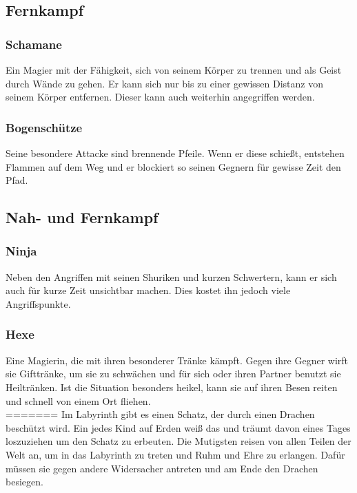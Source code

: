 \documentclass[10pt,a4paper,notitlepage]{report}
\begin{document}
\begin{flushleft}
\subsection{Fernkampf}
\subsubsection{Schamane}
Ein Magier mit der Fähigkeit, sich von seinem Körper zu trennen und als Geist durch Wände zu gehen. Er kann sich nur bis zu einer gewissen Distanz von seinem Körper entfernen. Dieser kann auch weiterhin angegriffen werden.\\
\subsubsection{Bogenschütze}
Seine besondere Attacke sind brennende Pfeile. Wenn er diese schießt, entstehen Flammen auf dem Weg und er blockiert so seinen Gegnern für gewisse Zeit den Pfad.\\
\subsection{Nah- und Fernkampf}
\subsubsection{Ninja}
Neben den Angriffen mit seinen Shuriken und kurzen Schwertern, kann er sich auch für kurze Zeit unsichtbar machen. Dies kostet ihn jedoch viele Angriffspunkte.\\
\subsubsection{Hexe}
Eine Magierin, die mit ihren besonderer Tränke kämpft. Gegen ihre Gegner wirft sie Gifttränke, um sie zu schwächen und für sich oder ihren Partner benutzt sie Heiltränken. Ist die Situation besonders heikel, kann sie auf ihren Besen reiten und schnell von einem Ort fliehen.\\
=======
Im Labyrinth gibt es einen Schatz, der durch einen Drachen beschützt wird. Ein jedes Kind auf Erden weiß das und träumt davon eines Tages loszuziehen um den Schatz zu erbeuten. Die Mutigsten reisen von allen Teilen der Welt an, um in das Labyrinth zu treten und Ruhm und Ehre zu erlangen. Dafür müssen sie gegen andere Widersacher antreten und am Ende den Drachen besiegen.\\

\end{flushleft}
\end{document}
